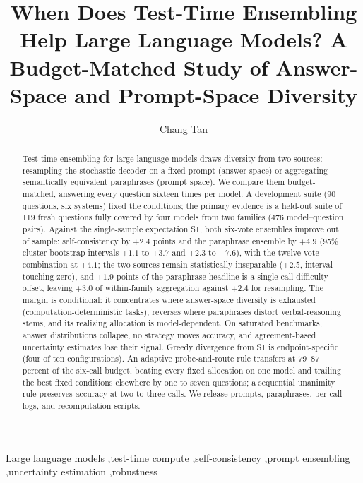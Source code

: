 \documentclass[preprint,12pt]{elsarticle}
\begin{document}
\begin{frontmatter}

\title{When Does Test-Time Ensembling Help Large Language Models? A Budget-Matched Study of Answer-Space and Prompt-Space Diversity}

\author[inst1]{Chang Tan}
\address[inst1]{Dalian University of Technology, No. 2 Linggong Road, Ganjingzi District, Dalian 116024, Liaoning, China}

\begin{abstract}
Test-time ensembling for large language models draws diversity from two sources: resampling the stochastic decoder on a fixed prompt (answer space) or aggregating semantically equivalent paraphrases (prompt space). We compare them budget-matched, answering every question sixteen times per model. A development suite (90 questions, six systems) fixed the conditions; the primary evidence is a held-out suite of 119 fresh questions fully covered by four models from two families (476 model--question pairs). Against the single-sample expectation S1, both six-vote ensembles improve out of sample: self-consistency by $+2.4$ points and the paraphrase ensemble by $+4.9$ (95\% cluster-bootstrap intervals $+1.1$ to $+3.7$ and $+2.3$ to $+7.6$), with the twelve-vote combination at $+4.1$; the two sources remain statistically inseparable ($+2.5$, interval touching zero), and $+1.9$ points of the paraphrase headline is a single-call difficulty offset, leaving $+3.0$ of within-family aggregation against $+2.4$ for resampling. The margin is conditional: it concentrates where answer-space diversity is exhausted (computation-deterministic tasks), reverses where paraphrases distort verbal-reasoning stems, and its realizing allocation is model-dependent. On saturated benchmarks, answer distributions collapse, no strategy moves accuracy, and agreement-based uncertainty estimates lose their signal. Greedy divergence from S1 is endpoint-specific (four of ten configurations). An adaptive probe-and-route rule transfers at 79--87 percent of the six-call budget, beating every fixed allocation on one model and trailing the best fixed conditions elsewhere by one to seven questions; a sequential unanimity rule preserves accuracy at two to three calls. We release prompts, paraphrases, per-call logs, and recomputation scripts.
\end{abstract}

\begin{keyword}
Large language models \sep test-time compute \sep self-consistency \sep prompt ensembling \sep uncertainty estimation \sep robustness
\end{keyword}

\end{frontmatter}
\end{document}

